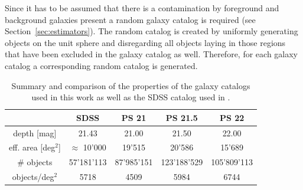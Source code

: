 \documentclass[a4paper,fleqn,usenatbib]{mnras}
\begin{document}

Since it has to be assumed that there is a contamination by foreground and background galaxies present a random galaxy catalog is required (see Section~\ref{sec:estimators}). The random catalog is created by uniformly generating objects on the unit sphere and disregarding all objects laying in those regions that have been excluded in the galaxy catalog as well. Therefore, for each galaxy catalog a corresponding random catalog is generated.

\begin{table}
    \centering
    \caption{Summary and comparison of the properties of the galaxy catalogs used in this work as well as the SDSS catalog used in \citet{more2016detection}.}
    \label{tab:galaxy_catalogs}
    \begin{tabular}{|c|c|c|c|c|}
    \hline 
    & SDSS & PS 21 & PS 21.5 & PS 22 \\ 
    \hline 
    depth [mag] & 21.43 & 21.00 & 21.50 & 22.00\\ 
    \hline 
    eff. area [deg$^2$] & $\approx$ 10'000 & 19'515 & 20'586 & 15'689\\ 
    \hline 
    \# objects & 57'181'113 & 87'985'151 & 123'188'529 & 105'809'113 \\
    \hline
    objects/deg$^2$ & 5718 & 4509 & 5984 & 6744\\ 
    \hline
    \end{tabular} 
\end{table}
\end{document}
